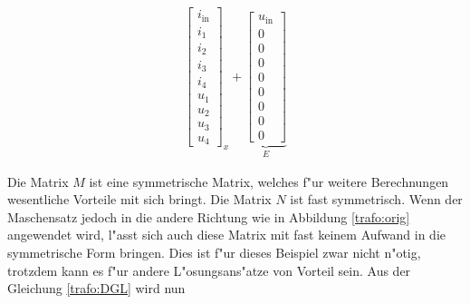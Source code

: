 \begin{refsection}
{\begin{align}
{\begin{bmatrix}
			i_\mathrm{in} \\
			i_1 \\
			i_2 \\
			i_3 \\
			i_4 \\
			u_1 \\
			u_2 \\
			u_3 \\
			u_4
			\end{bmatrix}}_{\text{$x$}}
			+
			\underbrace{\begin{bmatrix}
			u_\mathrm{in} \\
			0 \\
			0 \\
			0 \\
			0 \\
			0 \\
			0 \\
			0 \\
			0
			\end{bmatrix}}_{\text{$E$}}
			\label{trafo:DGL}
\end{align}
}
		


Die Matrix $M$ ist eine symmetrische Matrix, welches f"ur weitere Berechnungen wesentliche Vorteile mit sich bringt. Die Matrix $N$ ist fast symmetrisch. Wenn der Maschensatz jedoch in die andere Richtung wie in Abbildung \ref{trafo:orig} angewendet wird, l"asst sich auch diese Matrix mit fast keinem Aufwand in die symmetrische Form bringen. Dies ist f"ur dieses Beispiel zwar nicht n"otig, trotzdem kann es f"ur andere L"osungsans"atze von Vorteil sein. Aus der Gleichung \ref{trafo:DGL} wird nun 


\end{refsection}
